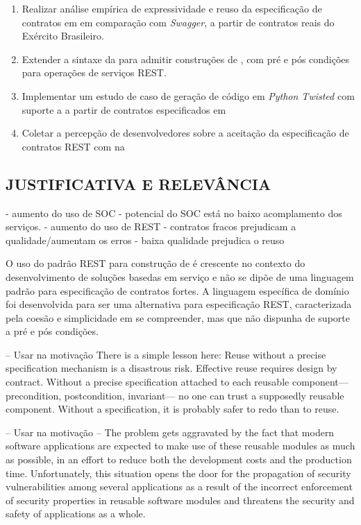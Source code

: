 \begin{enumerate}
  \item Realizar análise empírica de expressividade e reuso da especificação de
  contratos em \neoidl em comparação com \textit{Swagger}, a partir de contratos
  reais do Exército Brasileiro.
  \item Extender a sintaxe da \neoidl para admitir construções de 
  \designbycontract, com pré e pós condições para operações de serviços REST.
  \item Implementar um estudo de caso de geração de código em \textit{Python
  Twisted} com suporte a \designbycontract a partir de contratos especificados
  em \neoidl
  \item Coletar a percepção de desenvolvedores sobre a aceitação da
  especificação de contratos REST com \designbycontract na \neoidl
\end{enumerate}


\subsection{JUSTIFICATIVA E RELEVÂNCIA}
\vspace{-6mm}

- aumento do uso de SOC
- potencial do SOC está no baixo acomplamento dos serviços.
- aumento do uso de REST
- contratos fracos prejudicam a qualidade/aumentam os erros
- baixa qualidade prejudica o reuso

O uso do padrão REST para construção de \ws é crescente 
no contexto do desenvolvimento de soluções basedas em serviço e não se dipõe de
uma linguagem padrão para especificação de contratos fortes. A linguagem
específica de domínio \neoidl foi desenvolvida para ser uma alternativa para
especificação REST, caracterizada pela coesão e simplicidade em se compreender,
mas que não dispunha de suporte a pré e pós condições.



-- Usar na motivação
There is a simple lesson here: Reuse without a precise specification
mechanism is a disastrous risk.
Effective reuse requires design by contract.
Without a precise specification attached to each reusable component—
precondition, postcondition, invariant— no one can trust a supposedly reusable
component. Without a specification, it is probably safer to redo than to reuse.
\cite{jazequel1997design}



-- Usar na motivação --
The problem gets aggravated by
the fact that modern software applications are expected to
make use of these reusable modules as much as possible,
in an effort to reduce both the development costs and the
production time. Unfortunately, this situation opens the door
for the propagation of security vulnerabilities among several
applications as a result of the incorrect enforcement of security
properties in reusable software modules and threatens the
security and safety of applications as a whole.
\cite{rubio2013verifying}


